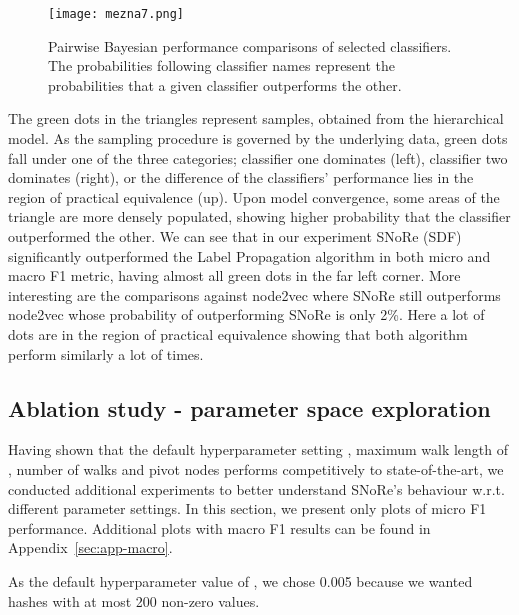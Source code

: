 \documentclass[twoside,11pt]{article}
\begin{document}
\begin{figure}[t!]
  \centering
  \texttt{[image: mezna7.png]}
  \caption{Pairwise Bayesian performance comparisons of selected classifiers. The probabilities following classifier names represent the probabilities that a given classifier outperforms the other.}
  \label{fig:bayes}
\end{figure}

The green dots in the triangles represent samples, obtained from the hierarchical model. As the sampling procedure is governed by the underlying data, green dots fall under one of the three categories; classifier one dominates (left), classifier two dominates (right), or the difference of the classifiers' performance lies in the region of practical equivalence (up). Upon model convergence, some areas of the triangle are more densely populated, showing higher probability that the classifier outperformed the other. We can see that in our experiment SNoRe (SDF) significantly outperformed the Label Propagation algorithm in both micro and macro F1 metric, having almost all green dots in the far left corner. More interesting are the comparisons against node2vec where SNoRe still outperforms node2vec whose probability of outperforming SNoRe is only 2\%. Here a lot of dots are in the region of practical equivalence showing that both algorithm perform similarly a lot of times.

\subsection{Ablation study - parameter space exploration}
Having shown that the default hyperparameter setting , maximum walk length of , number of walks  and  pivot nodes performs competitively to state-of-the-art, we conducted additional experiments to better understand SNoRe's behaviour w.r.t. different parameter settings. In this section, we present only plots of micro F1 performance. Additional plots with macro F1 results can be found in  Appendix~\ref{sec:app-macro}.

As the default hyperparameter value of , we chose 0.005 because we wanted hashes with at most 200 non-zero values.
\end{document}
